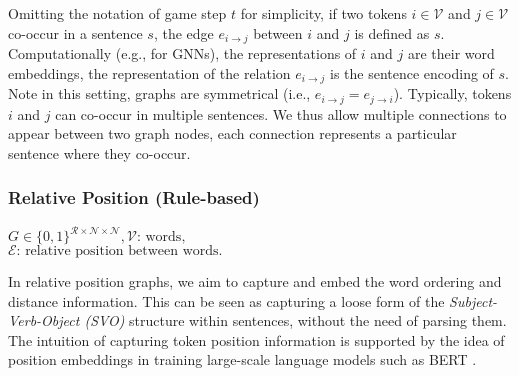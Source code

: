 \documentclass[11pt]{article}
\begin{document}
Omitting the notation of game step $t$ for simplicity, if two tokens $i \in \mathcal{V}$ and $j \in \mathcal{V}$ co-occur in a sentence $s$, the edge $e_{i \rightarrow j}$ between $i$ and $j$ is defined as $s$.
Computationally (e.g., for GNNs), the representations of $i$ and $j$ are their word embeddings, the representation of the relation $e_{i \rightarrow j}$ is the sentence encoding of $s$.
Note in this setting, graphs are symmetrical (i.e., $e_{i \rightarrow j} = e_{j \rightarrow i}$).
Typically, tokens $i$ and $j$ can co-occur in multiple sentences.
We thus allow multiple connections to appear between two graph nodes, each connection represents a particular sentence where they co-occur.



\subsubsection{Relative Position \textbf{\small{(Rule-based)}}}
\label{subsection:pos}
\begin{center}
    \textcolor{blue1}{\textbf{\small{$G \in \{0, 1\}^{\mathcal{R} \times \mathcal{N} \times \mathcal{N}}, \mathcal{V}\text{: words},$}}}\\
    \textcolor{blue1}{\textbf{\small{$\mathcal{E}\text{: relative position between words.}$}}}
\end{center}

In relative position graphs, we aim to capture and embed the word ordering and distance information.
This can be seen as capturing a loose form of the \textit{Subject-Verb-Object (SVO)} structure within sentences, without the need of parsing them.
The intuition of capturing token position information is supported by the idea of position embeddings in training large-scale language models such as BERT \citep{devlin2018bert,wang2021on}. 
\end{document}
